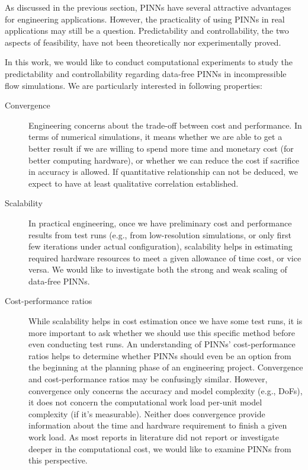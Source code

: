 
As discussed in the previous section, PINNs have several attractive advantages for engineering applications.
However, the practicality of using PINNs in real applications may still be a question.
Predictability and controllability, the two aspects of feasibility, have not been theoretically nor experimentally proved.

In this work, we would like to conduct computational experiments to study the predictability and controllability regarding data-free PINNs in incompressible flow simulations.
We are particularly interested in following properties:

\begin{description}
    \item[Convergence]
        Engineering concerns about the trade-off between cost and performance.
        In terms of numerical simulations, it means whether we are able to get a better result if we are willing to spend more time and monetary cost (for better computing hardware), or whether we can reduce the cost if sacrifice in accuracy is allowed.
        If quantitative relationship can not be deduced, we expect to have at least qualitative correlation established.
    \item[Scalability]
        In practical engineering, once we have preliminary cost and performance results from test runs (e.g., from low-resolution simulations, or only first few iterations under actual configuration), scalability helps in estimating required hardware resources to meet a given allowance of time cost, or vice versa. 
        We would like to investigate both the strong and weak scaling of data-free PINNs.
    \item[Cost-performance ratios]
        While scalability helps in cost estimation once we have some test runs, it is more important to ask whether we should use this specific method before even conducting test runs.
        An understanding of PINNs' cost-performance ratios helps to determine whether PINNs should even be an option from the beginning at the planning phase of an engineering project.
        Convergence and cost-performance ratios may be confusingly similar.
        However, convergence only concerns the accuracy and model complexity (e.g., DoFs), it does not concern the computational work load per-unit model complexity (if it's measurable).
        Neither does convergence provide information about the time and hardware requirement to finish a given work load.
        As most reports in literature did not report or investigate deeper in the computational cost, we would like to examine PINNs from this perspective.

\end{description}
